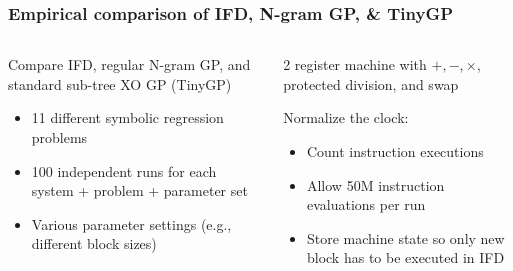 \documentclass{beamer}
\newcommand{\linespace}{\vskip 0.25cm}
\begin{document}
\begin{frame}
  \frametitle{Empirical comparison of IFD, N-gram GP, \& TinyGP}
  
  \begin{columns}[t]
  \begin{column}{0.45\textwidth}
  Compare IFD, regular N-gram GP, and standard sub-tree XO GP (TinyGP)
  \linespace
  \begin{itemize}
	\item 11 different symbolic regression problems
	\item 100 independent runs for each system + problem + parameter set
	\item Various parameter settings (e.g., different block sizes)
  \end{itemize}
  \end{column}

  \begin{column}{0.45\textwidth}
  2 register machine with $+, -, \times$, protected division, and swap
  
  \linespace
  
  Normalize the clock:
  \begin{itemize}
  	\item Count instruction executions
	\item Allow 50M instruction evaluations per run
	\item Store machine state so only new block has to be executed in IFD
  \end{itemize}
  
  \end{column}
  \end{columns}
\end{frame}
\end{document}
